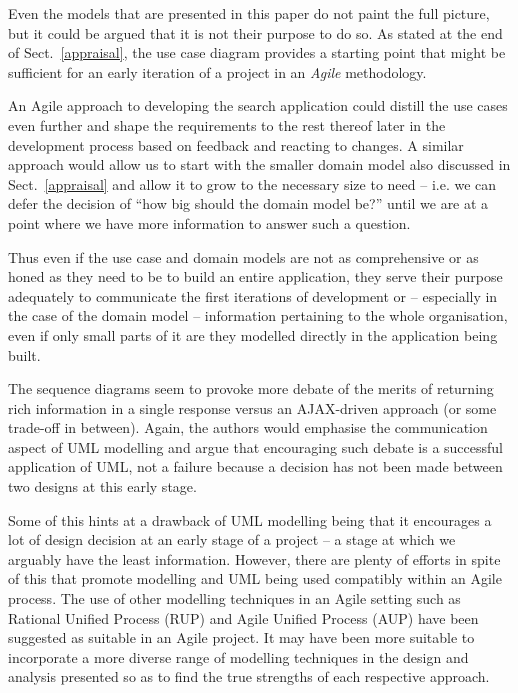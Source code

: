 \documentclass{llncs}
\begin{document}
Even the models that are presented in this paper do not paint the full
picture, but it could be argued that it is not their purpose to do so.
As stated at the end of Sect.~\ref{appraisal}, the use case diagram
provides a starting point that might be sufficient for an early
iteration of a project in an \emph{Agile} methodology\cite{beck2001agile}.

An Agile approach to developing the search application could distill
the use cases even further and shape the requirements to the rest
thereof later in the development process based on feedback and reacting
to changes. A similar approach would allow us to start with the smaller
domain model also discussed in Sect.~\ref{appraisal} and allow it to grow
to the necessary size to need -- i.e. we can defer the decision of ``how big
should the domain model be?'' until we are at a point where we have more
information to answer such a question.

Thus even if the use case and domain models are not as comprehensive or
as honed as they need to be to build an entire application, they serve
their purpose adequately to communicate the first iterations of
development or -- especially in the case of the domain model -- information
pertaining to the whole organisation, even if only small parts of it are
they modelled directly in the application being built.

The sequence diagrams seem to provoke more debate of the merits of
returning rich information in a single response versus an AJAX-driven
approach (or some trade-off in between). Again, the authors would emphasise the
communication aspect of UML modelling and argue that encouraging such debate
is a successful application of UML, not a failure because a decision
has not been made between two designs at this early stage.

Some of this hints at a drawback of UML modelling being that it encourages
a lot of design decision at an early stage of a project -- a stage at which we arguably
have the least information\cite{kelly2013conway}. However, there are plenty of
efforts in spite of this that promote modelling and UML being used
compatibly within an Agile process. The use of other modelling techniques
in an Agile setting such as
Rational Unified Process (RUP) and Agile Unified Process (AUP) have been
suggested as suitable in an Agile project\cite{ambler2002agile}.
 It may have been more suitable to incorporate
a more diverse range of modelling techniques in the design and analysis
presented so as to find the true strengths of each respective approach.
\end{document}
